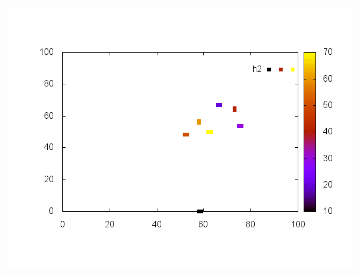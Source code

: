 \documentclass[10pt,a4paper]{article}
\begin{document}
\begin{figure}
\begin{subfigure}[b]{1\textwidth}
\includegraphics[scale=.3]{./img/SCC_Stable3/cut99p/2.png}
\end{subfigure}


\end{figure}
\end{document}
